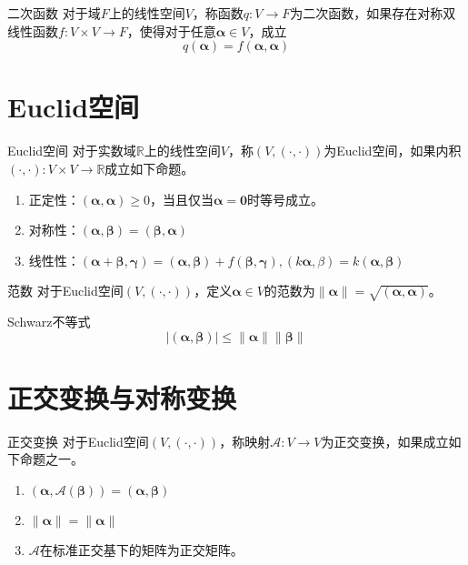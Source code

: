\documentclass[lang = cn, scheme = chinese, thmcnt = section]{elegantbook}
\newcommand{\R}{\mathbb{R}}            %
\newcommand{\bs}{\boldsymbol}          %
\begin{document}
\begin{definition}{二次函数}
	对于域$F$上的线性空间$V$，称函数$q:V\to F$为二次函数，如果存在对称双线性函数$f:V\times V\to F$，使得对于任意$\bs{\alpha}\in V$，成立
	$$
	q(\bs{\alpha})=f(\bs{\alpha},\bs{\alpha})
	$$
\end{definition}

\section{Euclid空间}

\begin{definition}{Euclid空间}
	对于实数域$\R$上的线性空间$V$，称$(V,(\cdot,\cdot))$为Euclid空间，如果内积$(\cdot,\cdot):V\times V\to\R$成立如下命题。
	\begin{enumerate}
		\item 正定性：$(\bs{\alpha},\bs{\alpha})\ge 0$，当且仅当$\bs{\alpha}=\bs{0}$时等号成立。
		\item 对称性：$(\bs{\alpha},\bs{\beta})=(\bs{\beta},\bs{\alpha})$
		\item 线性性：$(\bs{\alpha}+\bs{\beta},\bs{\gamma})=(\bs{\alpha},\bs{\beta})+f(\bs{\beta},\bs{\gamma}),(k\bs{\alpha},\beta)=k(\bs{\alpha},\bs{\beta})$
	\end{enumerate}
\end{definition}

\begin{definition}{范数}
	对于Euclid空间$(V,(\cdot,\cdot))$，定义$\bs{\alpha}\in V$的范数为$\|\bs{\alpha}\|=\sqrt{(\bs{\alpha},\bs{\alpha})}$。
\end{definition}

\begin{theorem}{Schwarz不等式}
	$$
	|(\bs{\alpha},\bs{\beta})|\le\|\bs{\alpha}\|\|\bs{\beta}\|
	$$
\end{theorem}

\section{正交变换与对称变换}

\begin{definition}{正交变换}
	对于Euclid空间$(V,(\cdot,\cdot))$，称映射$\mathscr{A}:V\to V$为正交变换，如果成立如下命题之一。
	\begin{enumerate}
		\item $(\mathscr{\bs{\alpha}},\mathscr{A}(\bs{\beta}))=(\bs{\alpha},\bs{\beta})$
		\item $\|\mathscr{\bs{\alpha}}\|=\|\bs{\alpha}\|$
		\item $\mathscr{A}$在标准正交基下的矩阵为正交矩阵。
	\end{enumerate}
\end{definition}
\end{document}

